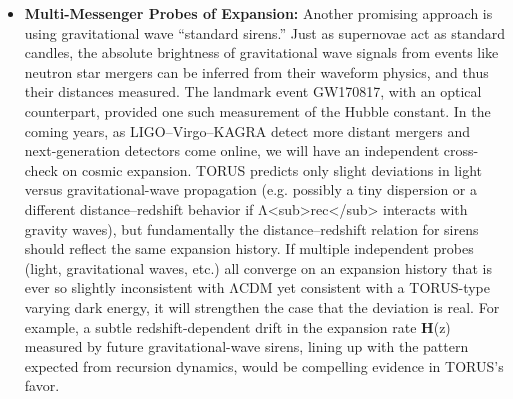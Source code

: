 \documentclass[
]{article}
\begin{document}
\begin{itemize}
  recursion-induced extra gravity term could manifest as a subtle
  lensing shear effect that suppresses the growth of structure on
  certain scales, offering a possible explanation for this discrepancy.
  Future surveys will clarify this: LSST and Euclid will measure the
  growth rate and clustering amplitude to unprecedented accuracy,
  tracking structure formation from early times to now. If they confirm
  a persistent deviation -- for example, a scale-dependent growth rate
  or an S\textless sub\textgreater8\textless/sub\textgreater{} value
  that remains significantly lower than ΛCDM predicts (say, by
  \textgreater5\% even with improving precision) -- it could be a
  signature of TORUS's extra gravity influence. Conversely, if structure
  growth and clustering amplitude perfectly match the ΛCDM predictions
  as observational uncertainties shrink (within \textasciitilde1\%), it
  would constrain or rule out any need for a recursion-based
  modification in the dark energy or gravity sector (Predictive
  Framework §3.2).
\item
  \textbf{Multi-Messenger Probes of Expansion:} Another promising
  approach is using gravitational wave ``standard sirens.'' Just as
  supernovae act as standard candles, the absolute brightness of
  gravitational wave signals from events like neutron star mergers can
  be inferred from their waveform physics, and thus their distances
  measured. The landmark event GW170817, with an optical counterpart,
  provided one such measurement of the Hubble constant. In the coming
  years, as LIGO--Virgo--KAGRA detect more distant mergers and
  next-generation detectors come online, we will have an independent
  cross-check on cosmic expansion. TORUS predicts only slight deviations
  in light versus gravitational-wave propagation (e.g. possibly a tiny
  dispersion or a different distance--redshift behavior if
  Λ\textless sub\textgreater rec\textless/sub\textgreater{} interacts
  with gravity waves), but fundamentally the distance--redshift relation
  for sirens should reflect the same expansion history. If multiple
  independent probes (light, gravitational waves, etc.) all converge on
  an expansion history that is ever so slightly inconsistent with ΛCDM
  yet consistent with a TORUS-type varying dark energy, it will
  strengthen the case that the deviation is real. For example, a subtle
  redshift-dependent drift in the expansion rate \textbf{H}(z) measured
  by future gravitational-wave sirens, lining up with the pattern
  expected from recursion dynamics, would be compelling evidence in
  TORUS's favor.
\end{itemize}
\end{document}
